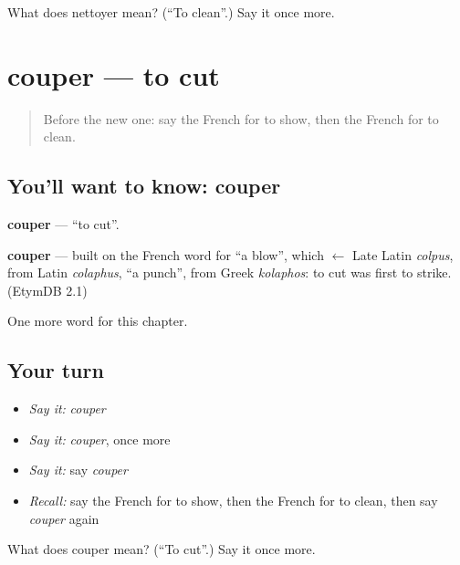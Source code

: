 \begin{tcolorbox}[breakable,colback=teal!4,colframe=teal!35!black,title={Before you move on}]
What does nettoyer mean? (\textquotedblleft{}To clean\textquotedblright{}.) Say it once more.
\end{tcolorbox}
\section[couper]{couper — to cut}

\label{lesson:FR-C63-couper}



\begin{quote}
Before the new one: say the French for to show, then the French for to clean.
\end{quote}

\subsection*{You'll want to know: couper}
\textbf{couper} — \textquotedblleft{}to cut\textquotedblright{}.

\begin{cousinweb}
\textbf{couper} — built on the French word for \textquotedblleft{}a blow\textquotedblright{}, which $\leftarrow$ Late Latin \emph{colpus}, from Latin \emph{colaphus}, \textquotedblleft{}a punch\textquotedblright{}, from Greek \emph{kolaphos}: to cut was first to strike. (EtymDB 2.1)
\end{cousinweb}

\begin{grammarlens}[title={What you've built}]
One more word for this chapter.
\end{grammarlens}

\subsection*{Your turn}
\begin{itemize}
\raggedright
  \item \emph{Say it:} \emph{couper}
  \item \emph{Say it:} \emph{couper}, once more
  \item \emph{Say it:} say \emph{couper}
  \item \emph{Recall:} say the French for to show, then the French for to clean, then say \emph{couper} again
\end{itemize}

\begin{tcolorbox}[breakable,colback=teal!4,colframe=teal!35!black,title={Before you move on}]
What does couper mean? (\textquotedblleft{}To cut\textquotedblright{}.) Say it once more.
\end{tcolorbox}
